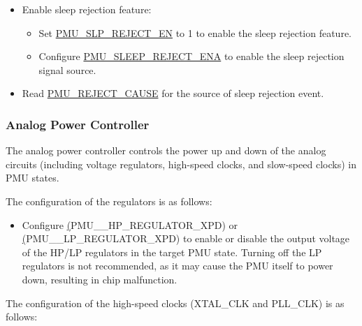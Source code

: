 \documentclass[main\_\_EN.tex]{subfiles}
\begin{document}
\begin{itemize}
    \item Enable sleep rejection feature:
    \begin{itemize}
        \item Set \hyperref[fielddesc:PMUSLPREJECTEN]{PMU\_SLP\_REJECT\_EN} to 1 to enable the sleep rejection feature.
        \item Configure \hyperref[fielddesc:PMUSLEEPREJECTENA]{PMU\_SLEEP\_REJECT\_ENA} to enable the sleep rejection signal source.
    \end{itemize}
    \item Read \hyperref[fielddesc:PMUREJECTCAUSE]{PMU\_REJECT\_CAUSE} for the source of sleep rejection event.
\end{itemize}

\subsubsection{Analog Power Controller}\label{sec:lowpowm_analog_power_controller}

The analog power controller controls the power up and down of the analog circuits (including voltage regulators, high-speed clocks, and slow-speed clocks) in PMU states.

The configuration of the regulators is as follows:

\begin{itemize}
    \item Configure \hyperref[fielddesc:PMUHPACTIVEHPREGULATORXPD](PMU\_\_HP\_REGULATOR\_XPD) or \hyperref[fielddesc:PMUHPSLEEPLPREGULATORXPD](PMU\_\_LP\_REGULATOR\_XPD) to enable or disable the output voltage of the HP/LP regulators in the target PMU state. Turning off the LP regulators is not recommended, as it may cause the PMU itself to power down, resulting in chip malfunction.
\end{itemize}

The configuration of the high-speed clocks (XTAL\_CLK and PLL\_CLK) is as follows:
\end{document}
